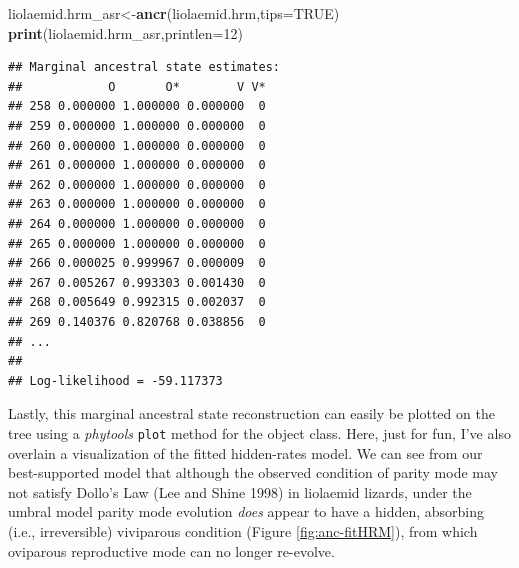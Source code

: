 \documentclass[fleqn,10pt,lineno]{wlpeerj} %
\newenvironment{Shaded}{\begin{snugshade}}{\end{snugshade}}
\newcommand{\AttributeTok}[1]{\textcolor[rgb]{0.13,0.29,0.53}{#1}}
\newcommand{\ConstantTok}[1]{\textcolor[rgb]{0.56,0.35,0.01}{#1}}
\newcommand{\DecValTok}[1]{\textcolor[rgb]{0.00,0.00,0.81}{#1}}
\newcommand{\FunctionTok}[1]{\textcolor[rgb]{0.13,0.29,0.53}{\textbf{#1}}}
\newcommand{\NormalTok}[1]{#1}
\newcommand{\OtherTok}[1]{\textcolor[rgb]{0.56,0.35,0.01}{#1}}
\begin{document}
\begin{Shaded}
\begin{Highlighting}[]
\NormalTok{liolaemid.hrm\_asr}\OtherTok{\textless{}{-}}\FunctionTok{ancr}\NormalTok{(liolaemid.hrm,}\AttributeTok{tips=}\ConstantTok{TRUE}\NormalTok{)}
\FunctionTok{print}\NormalTok{(liolaemid.hrm\_asr,}\AttributeTok{printlen=}\DecValTok{12}\NormalTok{)}
\end{Highlighting}
\end{Shaded}

\begin{verbatim}
## Marginal ancestral state estimates:
##            O       O*        V V*
## 258 0.000000 1.000000 0.000000  0
## 259 0.000000 1.000000 0.000000  0
## 260 0.000000 1.000000 0.000000  0
## 261 0.000000 1.000000 0.000000  0
## 262 0.000000 1.000000 0.000000  0
## 263 0.000000 1.000000 0.000000  0
## 264 0.000000 1.000000 0.000000  0
## 265 0.000000 1.000000 0.000000  0
## 266 0.000025 0.999967 0.000009  0
## 267 0.005267 0.993303 0.001430  0
## 268 0.005649 0.992315 0.002037  0
## 269 0.140376 0.820768 0.038856  0
## ...
## 
## Log-likelihood = -59.117373
\end{verbatim}

Lastly, this marginal ancestral state reconstruction can easily be plotted on the tree using a \emph{phytools} \texttt{plot} method for the object class. Here, just for fun, I've also overlain a visualization of the fitted hidden-rates model. We can see from our best-supported model that although the observed condition of parity mode may not satisfy Dollo's Law (Lee and Shine 1998) in liolaemid lizards, under the umbral model parity mode evolution \emph{does} appear to have a hidden, absorbing (i.e., irreversible) viviparous condition (Figure \ref{fig:anc-fitHRM}), from which oviparous reproductive mode can no longer re-evolve.
\end{document}

